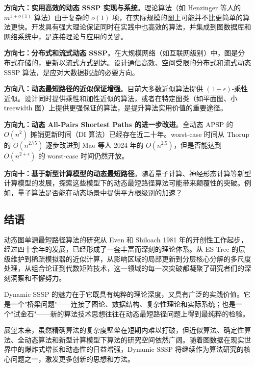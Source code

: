 \documentclass[12pt,a4paper]{ctexart}
\let\oldsection\section
\renewcommand{\section}{\clearpage\oldsection}
\begin{document}
\textbf{方向六：实用高效的动态 SSSP 实现与系统}。理论算法（如 Henzinger 等人的 $m^{1+o(1)}$ 算法）由于复杂的 $o(1)$ 项，在实际规模的图上可能并不比更简单的算法更快。开发具有强大理论保证同时在实践中也高效的算法，并集成到图数据库和网络系统中，是连接理论与应用的关键。

\textbf{方向七：分布式和流式动态 SSSP}。在大规模网络（如互联网级别）中，图是分布式存储的，更新以流式方式到达。设计通信高效、空间受限的分布式和流式动态 SSSP 算法，是应对大数据挑战的必要方向。

\textbf{方向八：动态最短路径的近似保证增强}。目前大多数近似算法提供 $(1+\epsilon)$-乘性近似。设计同时提供乘性和加性近似的算法，或者在特定图类（如平面图、小 treewidth 图）上提供更强保证的算法，是提升算法实用价值的重要途径。

\textbf{方向九：动态 All-Pairs Shortest Paths 的进一步改进}。全动态 APSP 的 $O(n^2)$ 摊销更新时间（DI 算法）已经存在近二十年。worst-case 时间从 Thorup 的 $O(n^{2.75})$ 逐步改进到 Mao 等人 2024 年的 $O(n^{2.5})$，但是否能达到 $O(n^{2+\epsilon})$ 的 worst-case 时间仍然开放。

\textbf{方向十：基于新型计算模型的动态最短路径}。随着量子计算、神经形态计算等新型计算模型的发展，探索这些模型下的动态最短路径算法可能带来颠覆性的突破。例如，量子算法是否能在动态场景中提供平方根级别的加速？

\subsection{结语}

动态图单源最短路径算法的研究从 Even 和 Shiloach 1981 年的开创性工作起步，经过四十余年的发展，已经形成了一套丰富而深刻的理论体系。从 ES Tree 的层级维护到稀疏模拟器的近似计算，从影响区域的局部更新到分层核心分解的多尺度处理，从组合论证到代数矩阵技术，这一领域的每一次突破都凝聚了研究者们的深刻洞察和不懈努力。

Dynamic SSSP 的魅力在于它既具有纯粹的理论深度，又具有广泛的实践价值。它是一个"桥梁问题"——连接了图论、数据结构、复杂性理论和实际系统；也是一个"试金石"——新的算法技术思想往往在动态最短路径问题上得到最纯粹的检验。

展望未来，虽然精确算法的复杂度壁垒在短期内难以打破，但近似算法、确定性算法、全动态算法和新型计算模型下算法的研究空间依然广阔。随着图数据在现实世界中的爆炸式增长和动态性的日益增强，Dynamic SSSP 将继续作为算法研究的核心问题之一，激发更多创新的思想和方法。


\let\section\oldsection
\end{document}
